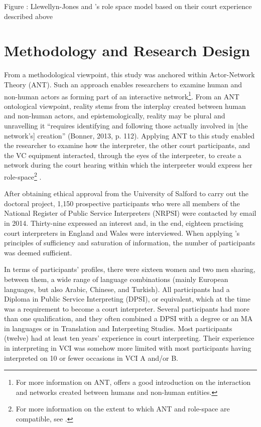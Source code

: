 \documentclass[output=paper]{langsci/langscibook}
\begin{document}
  
 

\begin{stylecaption}
Figure : Llewellyn-Jones and \citet{Lee2014}’s role space model based on their court experience described above
\end{stylecaption}

\section{Methodology and Research Design}

From a methodological viewpoint, this study was anchored within Actor-Network Theory (ANT). Such an approach enables researchers to examine human and non-human actors as forming part of an interactive network\footnote{For more information on ANT, \citet{Latour2005} offers a good introduction on the interaction and networks created between humans and non-human entities.}. From an ANT ontological viewpoint, reality stems from the interplay created between human and non-human actors, and epistemologically, reality may be plural and unravelling it “requires identifying and following those actually involved in [the network’s] creation” (Bonner, 2013, p. 112). Applying ANT to this study enabled the researcher to examine how the interpreter, the other court participants, and the VC equipment interacted, through the eyes of the interpreter, to create a network during the court hearing within which the interpreter would express her role-space\footnote{For more information on the extent to which ANT and role-space are compatible, see \citet{Devaux2017b}.} . 

After obtaining ethical approval from the University of Salford to carry out the doctoral project, 1,150 prospective participants who were all members of the National Register of Public Service Interpreters (NRPSI) were contacted by email in 2014. Thirty-nine expressed an interest and, in the end, eighteen practising court interpreters in England and Wales were interviewed. When applying \citet{Seidman2006}’s principles of sufficiency and saturation of information, the number of participants was deemed sufficient. 

In terms of participants’ profiles, there were sixteen women and two men sharing, between them, a wide range of language combinations (mainly European languages, but also Arabic, Chinese, and Turkish). All participants had a Diploma in Public Service Interpreting (DPSI), or equivalent, which at the time was a requirement to become a court interpreter. Several participants had more than one qualification, and they often combined a DPSI with a degree or an MA in languages or in Translation and Interpreting Studies. Most participants (twelve) had at least ten years’ experience in court interpreting. Their experience in interpreting in VCI was somehow more limited with most participants having interpreted on 10 or fewer occasions in VCI A and/or B.   
\end{document}
